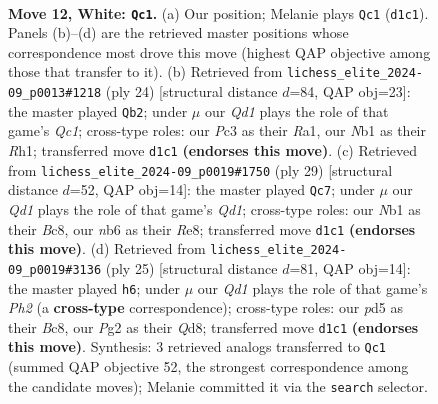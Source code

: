 \documentclass[11pt]{article}
\begin{document}
\begin{figure}[p]
\label{fig:thought-m20}
\end{figure}

\clearpage

\begin{figure}[p]\centering
\begin{subfigure}{0.46\textwidth}\centering
\resizebox{\linewidth}{!}{%
\newchessgame
\chessboard[
  setfen={r1bq1rk1/p4ppp/1n2pn2/2pp4/8/2PBPNP1/PP3RPP/RN1Q2K1 w - - 2 12},
  showmover=false,
  pgfstyle=straightmove, color=movearrow, markmove={d1-c1}
]}
\caption{}
\end{subfigure}\hfill
\begin{subfigure}{0.46\textwidth}\centering
\resizebox{\linewidth}{!}{%
\newchessgame
\chessboard[
  setfen={r1bqrn2/ppp2pk1/3p1np1/7p/1PPPp3/2N1P3/P2NBPPP/R1Q1K2R w KQ - 0 13},
  showmover=false,
  pgfstyle=straightmove, color=movearrow, markmove={c1-b2}
]}
\caption{}
\end{subfigure}
\\[4pt]
\begin{subfigure}{0.46\textwidth}\centering
\resizebox{\linewidth}{!}{%
\newchessgame
\chessboard[
  setfen={r1bqrnk1/1p3pp1/2p2n1p/p3p3/P3P3/2P1NNP1/1PQ2PBP/R3R1K1 b - - 0 15},
  showmover=false,
  pgfstyle=straightmove, color=movearrow, markmove={d8-c7}
]}
\caption{}
\end{subfigure}\hfill
\begin{subfigure}{0.46\textwidth}\centering
\resizebox{\linewidth}{!}{%
\newchessgame
\chessboard[
  setfen={r1bqr1k1/pp3ppp/2pb1nn1/4p3/4P3/2P1NNP1/PPQ2PBP/R1B1R1K1 b - - 0 13},
  showmover=false,
  pgfstyle=straightmove, color=movearrow, markmove={h7-h6}
]}
\caption{}
\end{subfigure}
\caption{\textbf{Move 12, White: \texttt{Qc1}.} (a) Our position; Melanie plays \texttt{Qc1} (\texttt{d1c1}). Panels (b)--(d) are the retrieved master positions whose correspondence most drove this move (highest QAP objective among those that transfer to it). (b) Retrieved from \texttt{lichess\_elite\_2024-09\_p0013\#1218} (ply 24) [structural distance $d$=84, QAP obj=23]: the master played \texttt{Qb2}; under $\mu$ our \emph{Qd1} plays the role of that game's \emph{Qc1}; cross-type roles: our \emph{P}c3 as their \emph{R}a1, our \emph{N}b1 as their \emph{R}h1; transferred move \texttt{d1c1} \textbf{(endorses this move)}. (c) Retrieved from \texttt{lichess\_elite\_2024-09\_p0019\#1750} (ply 29) [structural distance $d$=52, QAP obj=14]: the master played \texttt{Qc7}; under $\mu$ our \emph{Qd1} plays the role of that game's \emph{Qd1}; cross-type roles: our \emph{N}b1 as their \emph{B}c8, our \emph{n}b6 as their \emph{R}e8; transferred move \texttt{d1c1} \textbf{(endorses this move)}. (d) Retrieved from \texttt{lichess\_elite\_2024-09\_p0019\#3136} (ply 25) [structural distance $d$=81, QAP obj=14]: the master played \texttt{h6}; under $\mu$ our \emph{Qd1} plays the role of that game's \emph{Ph2} (a \textbf{cross-type} correspondence); cross-type roles: our \emph{p}d5 as their \emph{B}c8, our \emph{P}g2 as their \emph{Q}d8; transferred move \texttt{d1c1} \textbf{(endorses this move)}. Synthesis: 3 retrieved analogs transferred to \texttt{Qc1} (summed QAP objective 52, the strongest correspondence among the candidate moves); Melanie committed it via the \texttt{search} selector.}

\end{figure}
\end{document}
